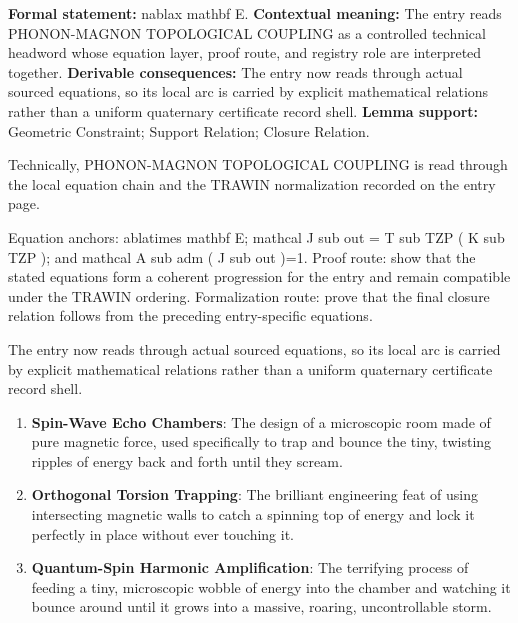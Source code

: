 \begingroup\footnotesize\setlength{\emergencystretch}{3em}\sloppy
\textbf{Formal statement:} nablax mathbf E. \textbf{Contextual meaning:} The entry reads PHONON-MAGNON TOPOLOGICAL COUPLING as a controlled technical headword whose equation layer, proof route, and registry role are interpreted together. \textbf{Derivable consequences:} The entry now reads through actual sourced equations, so its local arc is carried by explicit mathematical relations rather than a uniform quaternary certificate record shell. \textbf{Lemma support:} Geometric Constraint; Support Relation; Closure Relation.\par
\endgroup

Technically, PHONON-MAGNON TOPOLOGICAL COUPLING is read through the local equation chain and the TRAWIN normalization recorded on the entry page.

Equation anchors: ablatimes mathbf E; mathcal J sub out = T sub TZP ( K sub TZP ); and mathcal A sub adm ( J sub out )=1. Proof route: show that the stated equations form a coherent progression for the entry and remain compatible under the TRAWIN ordering. Formalization route: prove that the final closure relation follows from the preceding entry-specific equations.

The entry now reads through actual sourced equations, so its local arc is carried by explicit mathematical relations rather than a uniform quaternary certificate record shell.
\endgroup

\begin{enumerate}[leftmargin=1.6em,itemsep=6pt,topsep=4pt]
\item \textbf{Spin-Wave Echo Chambers}: The design of a microscopic room made of pure magnetic force, used specifically to trap and bounce the tiny, twisting ripples of energy back and forth until they scream.
\item \textbf{Orthogonal Torsion Trapping}: The brilliant engineering feat of using intersecting magnetic walls to catch a spinning top of energy and lock it perfectly in place without ever touching it.
\item \textbf{Quantum-Spin Harmonic Amplification}: The terrifying process of feeding a tiny, microscopic wobble of energy into the chamber and watching it bounce around until it grows into a massive, roaring, uncontrollable storm.
\end{enumerate}

